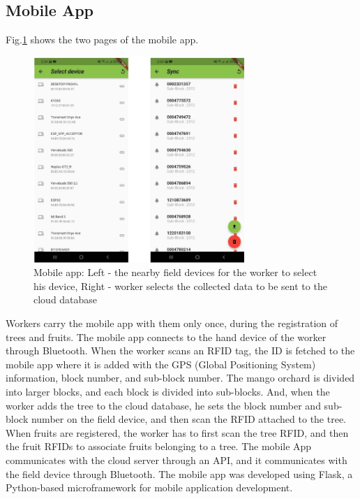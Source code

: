 \documentclass[journal]{IEEEtran}
\begin{document}
\subsection{Mobile App}
Fig.\ref{fig_app} shows the two pages of the mobile app.
\begin{figure}[htb]
	\centering
	\includegraphics[width = 8cm]{graphics/app.png}
	\caption{Mobile app: Left - the nearby field devices for the worker to select his device, Right - worker selects the collected data to be sent to the cloud database}
	\label{fig_app}
\end{figure}
Workers carry the mobile app with them only once, during the registration of trees and fruits. The mobile app connects to the hand device of the worker through Bluetooth. When the worker scans an RFID tag, the ID is fetched to the mobile app where it is added with the GPS (Global Positioning System) information, block number, and sub-block number. The mango orchard is divided into larger blocks, and each block is divided into sub-blocks.
And, when the worker adds the tree to the cloud database, he sets the block number and sub-block number on the field device, and then scan the RFID attached to the tree. When fruits are registered, the worker has to first scan the tree RFID, and then the fruit RFIDs to associate fruits belonging to a tree. The mobile App communicates with the cloud server through an API, and it communicates with the field device through Bluetooth. The mobile app was developed using Flask, a Python-based microframework for mobile application development.
\end{document}
